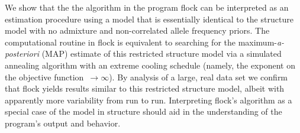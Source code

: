 
      We show that the the algorithm in the program {\sc flock} \citep{Duc&Tur2009} can be
interpreted as an estimation procedure using  
a model that is essentially identical to the {\sc structure} 
\citep{Pritchardetal2000} model with no admixture and non-correlated 
allele frequency priors. The computational routine in {\sc flock} is 
equivalent to searching for the maximum-{\em a-posteriori} (MAP) 
estimate of this restricted {\sc structure} model via a simulated 
annealing algorithm with an extreme cooling 
schedule (namely, the exponent on the objective function~$\rightarrow \infty$).  By analysis of a large, real data set we
confirm that {\sc flock} yields results similar to this restricted
{\sc structure} model, albeit with apparently more variability 
from run to run. Interpreting {\sc flock}'s algorithm as a special case of the model in 
{\sc structure} should aid in the understanding of the program's output and behavior. 
